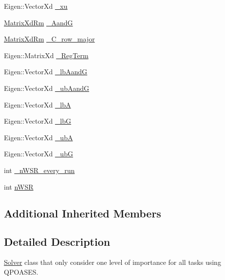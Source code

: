 \begin{DoxyCompactItemize}
\item 
Eigen\+::\+Vector\+Xd \hyperlink{classocra_1_1OneLevelSolverWithQPOASES_a23dd435ea8582fc67bf77373e0afc3e0}{\+\_\+xu}
\item 
\hyperlink{group__solver_ga70eb87299c2fc1db3c4aac05df67d889}{Matrix\+Xd\+Rm} \hyperlink{classocra_1_1OneLevelSolverWithQPOASES_ae427c9c48cc3538994f0c2b6b06da7d6}{\+\_\+\+AandG}
\item 
\hyperlink{group__solver_ga70eb87299c2fc1db3c4aac05df67d889}{Matrix\+Xd\+Rm} \hyperlink{classocra_1_1OneLevelSolverWithQPOASES_a5ad3c2a2670e8d7862735fefe2df6553}{\+\_\+\+C\+\_\+row\+\_\+major}
\item 
Eigen\+::\+Matrix\+Xd \hyperlink{classocra_1_1OneLevelSolverWithQPOASES_a586d9c2c84fac9044466d33dabac9f79}{\+\_\+\+Reg\+Term}
\item 
Eigen\+::\+Vector\+Xd \hyperlink{classocra_1_1OneLevelSolverWithQPOASES_ad7277d89275d722da93143ea58888579}{\+\_\+lb\+AandG}
\item 
Eigen\+::\+Vector\+Xd \hyperlink{classocra_1_1OneLevelSolverWithQPOASES_afa4902490254547640625dc2d9512577}{\+\_\+ub\+AandG}
\item 
Eigen\+::\+Vector\+Xd \hyperlink{classocra_1_1OneLevelSolverWithQPOASES_a3004e673e3f883cfba0b53f0a078ccd4}{\+\_\+lbA}
\item 
Eigen\+::\+Vector\+Xd \hyperlink{classocra_1_1OneLevelSolverWithQPOASES_ace6b99f95cf3d633fb0bb96c7871c57f}{\+\_\+lbG}
\item 
Eigen\+::\+Vector\+Xd \hyperlink{classocra_1_1OneLevelSolverWithQPOASES_a9e476513e7486c38bdb69c8fdd3b35d1}{\+\_\+ubA}
\item 
Eigen\+::\+Vector\+Xd \hyperlink{classocra_1_1OneLevelSolverWithQPOASES_ac3b8f982ead7c50e7396d99e63f02ac3}{\+\_\+ubG}
\item 
int \hyperlink{classocra_1_1OneLevelSolverWithQPOASES_af1bb606a75434adb15ad68b6db213848}{\+\_\+n\+W\+S\+R\+\_\+every\+\_\+run}
\item 
int \hyperlink{classocra_1_1OneLevelSolverWithQPOASES_aa9c7ddcbafeff12cacea92ac658a63d6}{n\+W\+SR}
\end{DoxyCompactItemize}
\subsection*{Additional Inherited Members}


\subsection{Detailed Description}
\hyperlink{classocra_1_1Solver}{Solver} class that only consider one level of importance for all tasks using Q\+P\+O\+A\+S\+ES. 

